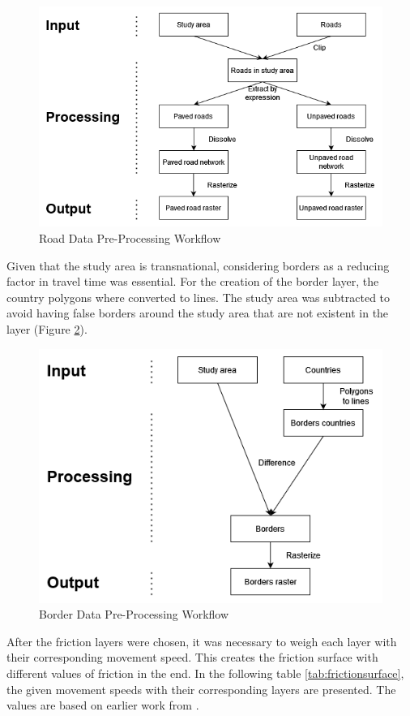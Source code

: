 \documentclass[11pt, a4paper]{report}
\begin{document}
\begin{figure}[H]
  \centering
  \includegraphics[width=0.9\linewidth]{figures/roadsworkflow.png}
  \caption{Road Data Pre-Processing Workflow}
  \label{fig:roadsworkflow}
\end{figure}

Given that the study area is transnational, considering borders as a reducing factor in travel time was essential. For the creation of the border layer, the country polygons where converted to lines. The study area was subtracted to avoid having false borders around the study area that are not existent in the layer (Figure \ref{fig:bordersworkflow}). 

\begin{figure}[H]
  \centering
  \includegraphics[width=0.9\linewidth]{figures/bordersworkflow.png}
  \caption{Border Data Pre-Processing Workflow}
  \label{fig:bordersworkflow}
\end{figure}

After the friction layers were chosen, it was necessary to weigh each layer with their corresponding movement speed. This creates the friction surface with different values of friction in the end. In the following table \ref{tab:frictionsurface}, the given movement speeds with their corresponding layers are presented. The values are based on earlier work from \citet{european_commission_joint_research_centre_global_2021}.
\end{document}
